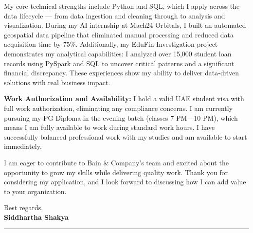 \documentclass[12pt,a4paper]{article}
\newcommand{\companyname}{Bain \& Company}
\begin{document}
My core technical strengths include Python and SQL, which I apply across the data lifecycle --- from data ingestion and cleaning through to analysis and visualization. During my AI internship at Mach24 Orbitals, I built an automated geospatial data pipeline that eliminated manual processing and reduced data acquisition time by 75\%. Additionally, my EduFin Investigation project demonstrates my analytical capabilities: I analyzed over 15,000 student loan records using PySpark and SQL to uncover critical patterns and a significant financial discrepancy. These experiences show my ability to deliver data-driven solutions with real business impact.

\textbf{Work Authorization and Availability:} I hold a valid UAE student visa with full work authorization, eliminating any compliance concerns. I am currently pursuing my PG Diploma in the evening batch (classes 7 PM---10 PM), which means I am fully available to work during standard work hours. I have successfully balanced professional work with my studies and am available to start immediately.

I am eager to contribute to \companyname's team and excited about the opportunity to grow my skills while delivering quality work. Thank you for considering my application, and I look forward to discussing how I can add value to your organization.

\vspace{3mm}

Best regards, \\
\textbf{Siddhartha Shakya}

\vfill
{\color{cvteal}\rule{\linewidth}{1mm}}
\end{document}
